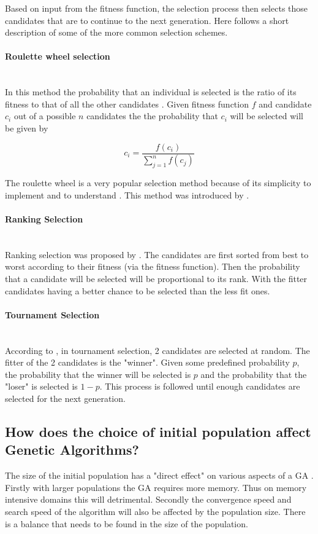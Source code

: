 \documentclass[12pt,a4paper]{report}
\newcommand{\subsubsubsection}[1]{\paragraph{#1}\mbox{}\\}
\begin{document}
Based on input from the fitness function, the selection process then selects those candidates that are to continue to the next generation. Here follows a short description of some of the more common selection schemes.

\subsubsubsection{Roulette wheel selection}

In this method the probability that an individual is selected is the ratio of its fitness to that of all the other candidates \citep{michell}. Given fitness function $f$ and candidate $c_i$ out of a possible $n$ candidates the the probability that $c_i$ will be selected will be given by

\begin{equation}
c_i = \frac{f(c_i)}{\sum_{j=1}^n f(c_j)}
\end{equation} 
    
The roulette wheel is a very popular selection method because of its simplicity to implement and to understand \citep{Lipowski2011}. This method was introduced by \cite{de1975analysis}.

\subsubsubsection{Ranking Selection}

Ranking selection was proposed by \cite{baker1985adaptive}. The candidates are first sorted from best to worst according to their fitness (via the fitness function). Then the probability that a candidate will be selected will be proportional to its rank. With the fitter candidates having a better chance to be selected than the less fit ones.

\subsubsubsection{Tournament Selection}

According to \citep{michell}, in tournament selection, 2 candidates are selected at random. The fitter of the 2 candidates is the "winner". Given some predefined probability $p$, the probability that the winner will be selected is $p$ and the probability that the "loser" is selected is $1-p$. This process is followed until enough candidates are selected for the next generation. 

\subsection{How does the choice of initial population affect Genetic Algorithms?}
The size of the initial population has a "direct effect" on various aspects of a GA \citep{gupta}. Firstly with larger populations the GA requires more memory. Thus on memory intensive domains this will detrimental. Secondly the convergence speed and search speed of the algorithm will also be affected by the population size. There is a balance that needs to be found in the size of the population. 
\end{document}
